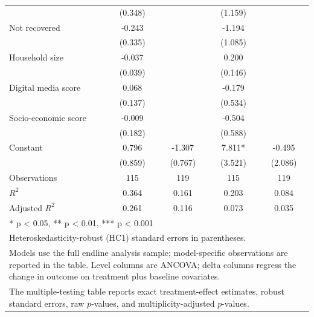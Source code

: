 \begin{table}
\begin{tabular}[t]{lcccc}
 & (0.348) &  & (1.159) & \\
Not recovered & -0.243 &  & -1.194 & \\
 & (0.335) &  & (1.085) & \\
Household size & -0.037 &  & 0.200 & \\
 & (0.039) &  & (0.146) & \\
Digital media score & 0.068 &  & -0.179 & \\
 & (0.137) &  & (0.534) & \\
Socio-economic score & -0.009 &  & -0.504 & \\
 & (0.182) &  & (0.588) & \\
Constant & 0.796 & -1.307 & 7.811* & -0.495\\
 & (0.859) & (0.767) & (3.521) & (2.086)\\
Observations & 115 & 119 & 115 & 119\\
$R^{2}$ & 0.364 & 0.161 & 0.203 & 0.084\\
Adjusted $R^{2}$ & 0.261 & 0.116 & 0.073 & 0.035\\
\bottomrule
\multicolumn{5}{l}{\rule{0pt}{1em}* p < 0.05, ** p < 0.01, *** p < 0.001}\\
\multicolumn{5}{l}{\rule{0pt}{1em}Heteroskedasticity-robust (HC1) standard errors in parentheses.}\\
\multicolumn{5}{l}{\rule{0pt}{1em}Models use the full endline analysis sample; model-specific observations are reported in the table. Level columns are ANCOVA; delta columns regress the change in outcome on treatment plus baseline covariates.}\\
\multicolumn{5}{l}{\rule{0pt}{1em}The multiple-testing table reports exact treatment-effect estimates, robust standard errors, raw $p$-values, and multiplicity-adjusted $p$-values.}\\
\end{tabular}
\end{table}
